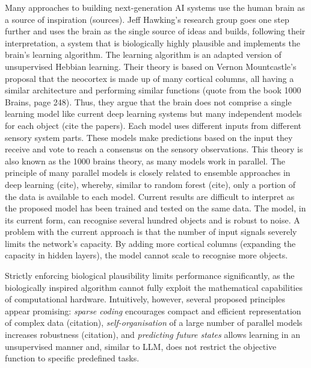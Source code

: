 Many approaches to building next-generation AI systems use the human brain as a source of inspiration (sources). Jeff Hawking's research group goes one step further and uses the brain as the single source of ideas and builds, following their interpretation, a system that is biologically highly plausible and implements the brain's learning algorithm. The learning algorithm is an adapted version of unsupervised Hebbian learning. Their theory is based on Vernon Mountcastle's proposal that the neocortex is made up of many cortical columns, all having a similar architecture and performing similar functions (quote from the book 1000 Brains, page 248). Thus, they argue that the brain does not comprise a single learning model like current deep learning systems but many independent models for each object (cite the papers). Each model uses different inputs from different sensory system parts. These models make predictions based on the input they receive and vote to reach a consensus on the sensory observations.
This theory is also known as the 1000 brains theory, as many models work in parallel. The principle of many parallel models is closely related to ensemble approaches in deep learning (cite), whereby, similar to random forest (cite), only a portion of the data is available to each model. Current results are difficult to interpret as the proposed model has been trained and tested on the same data. The model, in its current form, can recognise several hundred objects and is robust to noise. A problem with the current approach is that the number of input signals severely limits the network's capacity. By adding more cortical columns (expanding the capacity in hidden layers), the model cannot scale to recognise more objects. 

Strictly enforcing biological plausibility limits performance significantly, as the biologically inspired algorithm cannot fully exploit the mathematical capabilities of computational hardware. Intuitively, however, several proposed principles appear promising: \emph{sparse coding} encourages compact and efficient representation of complex data (citation), \emph{self-organisation} of a large number of parallel models increases robustness (citation), and \emph{predicting future states} allows learning in an unsupervised manner and, similar to LLM, does not restrict the objective function to specific predefined tasks.

